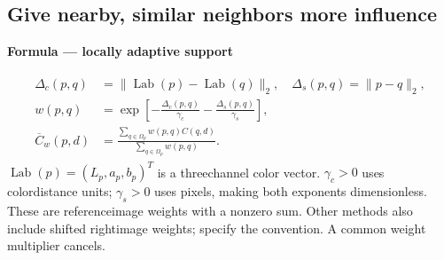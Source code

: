 \documentclass[letterpaper,11pt,english,openany,oneside]{jupyterBook}
\begin{document}
\subsection{Give nearby, similar neighbors more influence}
\label{\detokenize{lectures/lecture04/matching:give-nearby-similar-neighbors-more-influence}}
\begin{TextbookBox}
\textbf{Formula — locally adaptive support}\par\smallskip
\begin{equation}\label{equation:lectures/lecture04/matching:eq-lec04-adaptive}
\begin{split}\begin{aligned}
\Delta_c(p,q)&=\|\operatorname{Lab}(p)-\operatorname{Lab}(q)\|_2,
\quad \Delta_s(p,q)=\|p-q\|_2,\\
w(p,q)&=\exp\left[-\frac{\Delta_c(p,q)}{\gamma_c}
-\frac{\Delta_s(p,q)}{\gamma_s}\right],\\
\overline C_w(p,d)&=\frac{\sum_{q\in\Omega_p}w(p,q)C(q,d)}
{\sum_{q\in\Omega_p}w(p,q)}.
\end{aligned}\end{split}
\end{equation}
\sphinxAtStartPar
\(\operatorname{Lab}(p)=(L_p,a_p,b_p)^T\) is a three\sphinxhyphen{}channel color vector. \(\gamma_c>0\) uses color\sphinxhyphen{}distance units; \(\gamma_s>0\) uses pixels, making both exponents dimensionless. These are reference\sphinxhyphen{}image weights with a nonzero sum. Other methods also include shifted right\sphinxhyphen{}image weights; specify the convention. A common weight multiplier cancels.

\end{TextbookBox}
\end{document}
